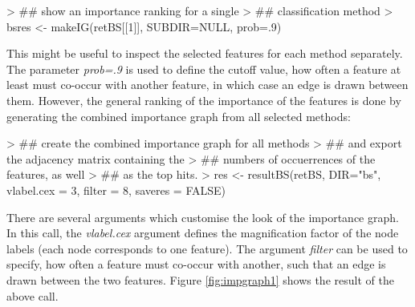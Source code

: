 \documentclass[11pt,a4paper]{article}
\begin{document}
\begin{Schunk}
\begin{Sinput}
> ## show an importance ranking for a single 
> ## classification method
> bsres <- makeIG(retBS[[1]], SUBDIR=NULL, prob=.9)
\end{Sinput}
\end{Schunk}

This might be useful to inspect the selected features for each method separately. The parameter \emph{prob=.9} is used to define the cutoff value, how often a feature at least must co-occur with another feature, in which case an edge is drawn between them. However, the general ranking of the importance of the features is done by generating the combined importance graph from all selected methods:

\begin{Schunk}
\begin{Sinput}
> ## create the combined importance graph for all methods
> ## and export the adjacency matrix containing the 
> ## numbers of occuerrences of the features, as well 
> ## as the top hits.
> res <- resultBS(retBS, DIR="bs", vlabel.cex = 3, filter = 8, saveres = FALSE)
\end{Sinput}
\end{Schunk}

There are several arguments which customise the look of the importance graph. In this call, the \emph{vlabel.cex} argument defines the magnification factor of the node labels (each node corresponds to one feature). The argument \emph{filter} can be used to specify, how often a feature must co-occur with another, such that an edge is drawn between the two features. Figure \ref{fig:impgraph1} shows the result of the above call.
\end{document}
